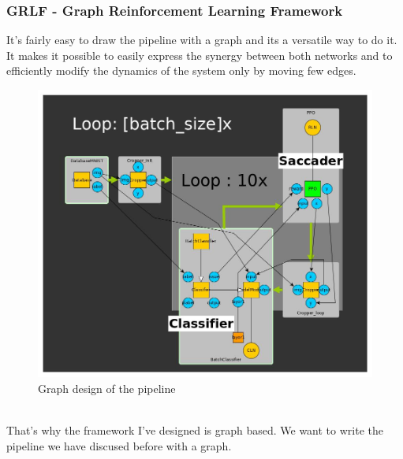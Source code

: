 \documentclass[11pt]{article}
\begin{document}
\subsubsection{GRLF - Graph Reinforcement Learning Framework}
It's fairly easy to draw the pipeline with a graph and its a versatile way to do it. It makes it possible to easily express the synergy between both networks and to efficiently modify the dynamics of the system only by moving few edges.
\begin{figure}[!h]
\centering
\includegraphics[scale=0.30]{design.jpg}
\caption{Graph design of the pipeline}
\label{design}
\end{figure}\\
That's why the framework I've designed is graph based. We want to write the pipeline we have discused before with a graph.
\end{document}
